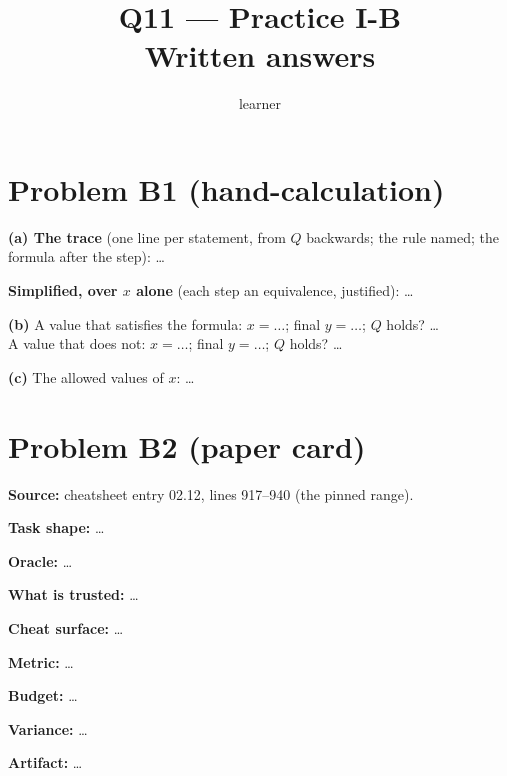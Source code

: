 \documentclass[11pt]{article}
\title{Q11 --- Practice I-B \\ \large Written answers}
\author{learner}
\date{}
\begin{document}
\maketitle

\section*{Problem B1 (hand-calculation)}\label{ans:B1}
\begin{answer}
\textbf{(a) The trace} (one line per statement, from $Q$ backwards; the rule
named; the formula after the step): \dots

\textbf{Simplified, over $x$ alone} (each step an equivalence, justified):
\dots

\textbf{(b)} A value that satisfies the formula: $x = \dots$; final $y = \dots$;
$Q$ holds? \dots \\
A value that does not: $x = \dots$; final $y = \dots$; $Q$ holds? \dots

\textbf{(c)} The allowed values of $x$: \dots
\end{answer}

\section*{Problem B2 (paper card)}\label{ans:B2}
\begin{answer}
\textbf{Source:} cheatsheet entry 02.12, lines 917--940 (the pinned range).

\textbf{Task shape:} \dots

\textbf{Oracle:} \dots

\textbf{What is trusted:} \dots

\textbf{Cheat surface:} \dots

\textbf{Metric:} \dots

\textbf{Budget:} \dots

\textbf{Variance:} \dots

\textbf{Artifact:} \dots
\end{answer}
\end{document}
